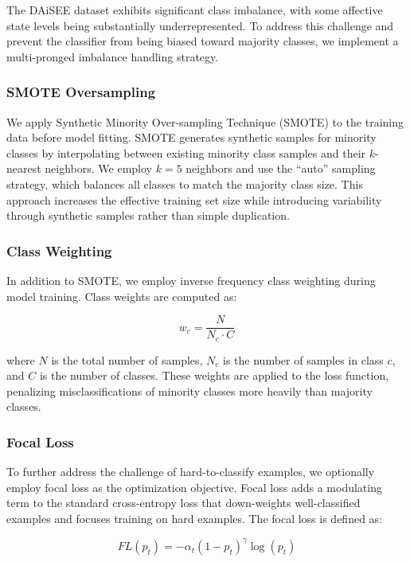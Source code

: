 \documentclass[11pt,a4paper]{article}
\begin{document}
The DAiSEE dataset exhibits significant class imbalance, with some affective state levels being substantially underrepresented. To address this challenge and prevent the classifier from being biased toward majority classes, we implement a multi-pronged imbalance handling strategy.

\subsubsection{SMOTE Oversampling}

We apply Synthetic Minority Over-sampling Technique (SMOTE) to the training data before model fitting. SMOTE generates synthetic samples for minority classes by interpolating between existing minority class samples and their $k$-nearest neighbors. We employ $k = 5$ neighbors and use the ``auto'' sampling strategy, which balances all classes to match the majority class size. This approach increases the effective training set size while introducing variability through synthetic samples rather than simple duplication.

\subsubsection{Class Weighting}

In addition to SMOTE, we employ inverse frequency class weighting during model training. Class weights are computed as:

\begin{equation}
  w_c = \frac{N}{N_c \cdot C}
\end{equation}

where $N$ is the total number of samples, $N_c$ is the number of samples in class $c$, and $C$ is the number of classes. These weights are applied to the loss function, penalizing misclassifications of minority classes more heavily than majority classes.

\subsubsection{Focal Loss}

To further address the challenge of hard-to-classify examples, we optionally employ focal loss as the optimization objective. Focal loss adds a modulating term to the standard cross-entropy loss that down-weights well-classified examples and focuses training on hard examples. The focal loss is defined as:

\begin{equation}
  FL(p_t) = -\alpha_t (1 - p_t)^{\gamma} \log(p_t)
\end{equation}
\end{document}
